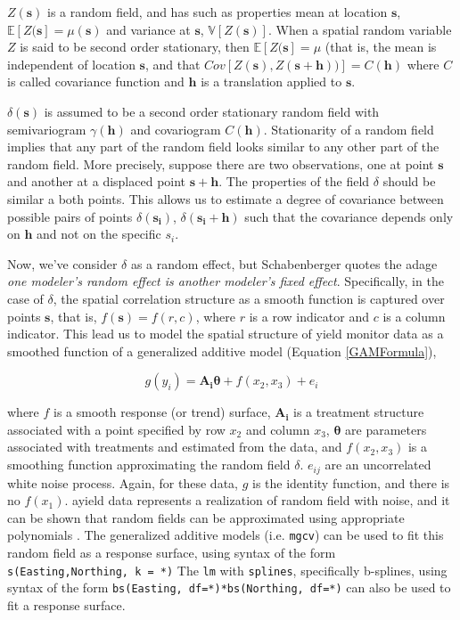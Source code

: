 \documentclass[phdcss]{SDSUThesis}
\begin{document}
$Z(\mathbf{s})$ is a random field, and has such as properties mean at location $\mathbf{s}$, $\mathbb{E}[Z(\mathbf{s}] = \mu(\mathbf{s})$ and variance at $\mathbf{s}$, $\mathbb{V}[Z(\mathbf{s})]$. When a spatial random variable $Z$ is said to be second order stationary, then $\mathbb{E}[Z(\mathbf{s}] = \mu$ (that is, the mean is independent of location $\mathbf{s}$, and that $Cov[Z(\mathbf{s}),Z(\mathbf{s}+\mathbf{h}))] = C(\mathbf{h})$ where $C$ is called covariance function and $\mathbf{h}$ is a translation applied to $\mathbf{s}$. 

$\delta(\mathbf{s})$ is assumed to be a second order stationary random field with semivariogram $\gamma(\mathbf{h})$ and covariogram $C(\mathbf{h})$. Stationarity of a random field implies that any part of the random field looks similar to any other part of the random field. More precisely, suppose there are two observations, one at point $\mathbf{s}$ and another at a displaced point $\mathbf{s} + \mathbf{h}$. The properties of the field $\delta$ should be similar a both points. This allows us to estimate a degree of covariance between possible pairs of points $\delta(\mathbf{s_i})$, $\delta(\mathbf{s_i}+\mathbf{h})$ such that the covariance depends only on $\mathbf{h}$ and not on the specific $s_i$. 

Now, we've consider $\delta$ as a random effect, but Schabenberger \cite{schabenberger-2001} quotes the adage \textit{one modeler's random effect is another modeler's fixed effect}. Specifically, in the case of $\delta$,  the spatial correlation structure as a smooth function is captured over points $\mathbf{s}$, that is, $f(\mathbf{s}) = f(r, c)$, where $r$ is a row indicator and $c$ is a column indicator. This lead us to model the spatial structure of yield monitor data as a smoothed function of a generalized additive model (Equation \ref{GAMFormula}),

\begin{equation}\label{SpatialGAM}
   g(y_{i}) = \mathbf{A_i} \mathbf{\theta} + f(x_2, x_3) + e_{i}
\end{equation}

where $f$ is a smooth response (or trend) surface, $\mathbf{A_i}$ is a treatment structure associated with a point specified by row $x_2$ and column $x_3$, $\mathbf{\theta}$ are parameters associated with treatments and estimated from the data, and $f(x_2,x_3)$ is a smoothing function approximating the random field $\delta$. $e_{ij}$ are an uncorrelated white noise process. Again, for these data, $g$ is the identity function, and there is no $f(x_1)$. ayield data represents a realization of random field with noise, and it can be shown that random fields can be approximated using appropriate polynomials \cite{kent-1989}. The generalized additive models (i.e. \texttt{mgcv}) can be used to fit this random field as a response surface, using syntax of the form \texttt{s(Easting,Northing, k = *)}  The \texttt{lm} with \texttt{splines}, specifically b-splines, using syntax of the form \texttt{bs(Easting, df=*)*bs(Northing, df=*)} can also be used to fit a response surface.
\end{document}
